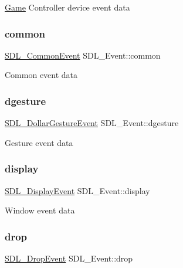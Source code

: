 \mbox{\hyperlink{class_game}{Game}} Controller device event data \mbox{\label{union_s_d_l___event_abe5cb8767f93de55163c8ddd4562a7f2}} 
\subsubsection{\texorpdfstring{common}{common}}
{\footnotesize\ttfamily \mbox{\hyperlink{struct_s_d_l___common_event}{S\+D\+L\+\_\+\+Common\+Event}} S\+D\+L\+\_\+\+Event\+::common}

Common event data \mbox{\label{union_s_d_l___event_a4481167b9f8549aeb254e97ca812e74d}} 
\subsubsection{\texorpdfstring{dgesture}{dgesture}}
{\footnotesize\ttfamily \mbox{\hyperlink{struct_s_d_l___dollar_gesture_event}{S\+D\+L\+\_\+\+Dollar\+Gesture\+Event}} S\+D\+L\+\_\+\+Event\+::dgesture}

Gesture event data \mbox{\label{union_s_d_l___event_afe513d46e191a9791988b9adab705ef6}} 
\subsubsection{\texorpdfstring{display}{display}}
{\footnotesize\ttfamily \mbox{\hyperlink{struct_s_d_l___display_event}{S\+D\+L\+\_\+\+Display\+Event}} S\+D\+L\+\_\+\+Event\+::display}

Window event data \mbox{\label{union_s_d_l___event_acff77bccbca65abbb876360a3f5209c9}} 
\subsubsection{\texorpdfstring{drop}{drop}}
{\footnotesize\ttfamily \mbox{\hyperlink{struct_s_d_l___drop_event}{S\+D\+L\+\_\+\+Drop\+Event}} S\+D\+L\+\_\+\+Event\+::drop}


